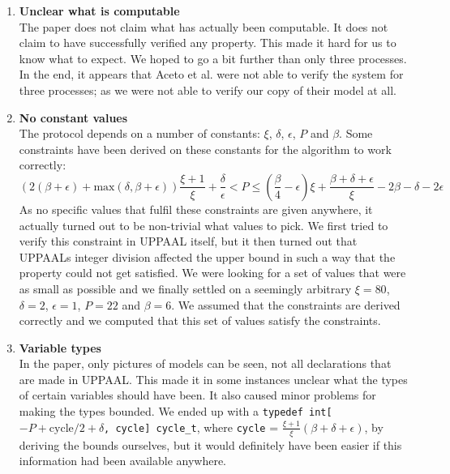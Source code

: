 \documentclass[a4paper,10pt]{article}
\newcommand{\UPPAAL}{UPPAAL\xspace}
\begin{document}
\begin{enumerate}
\item \textbf{Unclear what is computable} \\
	The paper does not claim what has actually been computable. It does not claim to have successfully verified any property. This made it hard for us to know what to expect. We hoped to go a bit further than only three processes. In the end, it appears that Aceto et al. \cite{Aceto2004Notes} were not able to verify the system for three processes; as we were not able to verify our copy of their model at all.

\item \textbf{No constant values} \\
	The protocol depends on a number of constants: \(\xi\), \(\delta\), \(\epsilon\), \(P\) and \(\beta\). Some constraints have been derived on these constants for the algorithm to work correctly:
	\[ (2(\beta+\epsilon)+\textrm{max}(\delta,\beta+\epsilon))\frac{\xi+1}{\xi} + \frac{\delta}{\epsilon} < P \le (\frac{\beta}{4}-\epsilon)\xi + \frac{\beta+\delta+\epsilon}{\xi}-2\beta-\delta-2\epsilon \]
	As no specific values that fulfil these constraints are given anywhere, it actually turned out to be non-trivial what values to pick. We first tried to verify this constraint in \UPPAAL itself, but it then turned out that \UPPAAL{}s integer division affected the upper bound in such a way that the property could not get satisfied. We were looking for a set of values that were as small as possible and we finally settled on a seemingly arbitrary \(\xi=80\), \(\delta=2\), \(\epsilon=1\), \(P=22\) and \(\beta=6\). We assumed that the constraints are derived correctly and we computed that this set of values satisfy the constraints.

\item \textbf{Variable types} \\
	In the paper, only pictures of models can be seen, not all declarations that are made in \UPPAAL. This made it in some instances unclear what the types of certain variables should have been. It also caused minor problems for making the types bounded. We ended up with a \texttt{typedef int[\(-P+\text{cycle}/2+\delta\), cycle] cycle\_t}, where \texttt{cycle} = \(\frac{\xi+1}{\xi}(\beta+\delta+\epsilon)\), by deriving the bounds ourselves, but it would definitely have been easier if this information had been available anywhere.
\end{enumerate}

\end{document}
